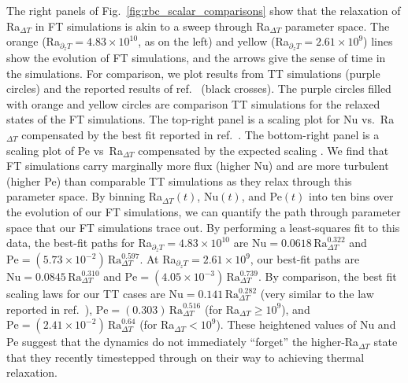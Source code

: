 \documentclass[aps, pre, onecolumn, nofootinbib, notitlepage, groupedaddress, amsfonts, amssymb, amsmath, longbibliography, superscriptaddress]{revtex4-1}
\begin{document}
The right panels of Fig.~\ref{fig:rbc_scalar_comparisons} show that the relaxation of Ra$_{\Delta T}$ in FT simulations is akin to a sweep through Ra$_{\Delta T}$ parameter space.
The orange (Ra$_{\partial_z T} = 4.83 \times 10^{10}$, as on the left) and yellow (Ra$_{\partial_z T} = 2.61 \times 10^{9}$) lines show the evolution of FT simulations, and the arrows give the sense of time in the simulations.
For comparison, we plot results from TT simulations (purple circles) and the reported results of ref.~\cite{zhu&all2018} (black crosses).
The purple circles filled with orange and yellow circles are comparison TT simulations for the relaxed states of the FT simulations.
The top-right panel is a scaling plot for Nu vs.~Ra$_{\Delta T}$ compensated by the best fit reported in ref.~\cite{johnston&doering2009}.
The bottom-right panel is a scaling plot of Pe vs~Ra$_{\Delta T}$ compensated by the expected scaling \cite{ahlers&all2009}.
We find that FT simulations carry marginally more flux (higher Nu) and are more turbulent (higher Pe) than comparable TT simulations as they relax through this parameter space.
By binning Ra$_{\Delta T}(t)$, Nu$(t)$, and Pe$(t)$ into ten bins over the evolution of our FT simulations, we can quantify the path through parameter space that our FT simulations trace out.
By performing a least-squares fit to this data, the best-fit paths for Ra$_{\partial_z T} = 4.83 \times 10^{10}$ are $\text{Nu} = 0.0618\,\text{Ra}_{\Delta T}^{0.322}$ and $\text{Pe} = (5.73 \times 10^{-2})\,\text{Ra}_{\Delta T}^{0.597}$.
At Ra$_{\partial_z T} = 2.61 \times 10^{9}$, our best-fit paths are $\text{Nu} = 0.0845\,\text{Ra}_{\Delta T}^{0.310}$ and $\text{Pe} = (4.05 \times 10^{-3})\,\text{Ra}_{\Delta T}^{0.739}$.
By comparison, the best fit scaling laws for our TT cases are $\text{Nu} = 0.141\,\text{Ra}_{\Delta T}^{0.282}$ (very similar to the law reported in ref.~\cite{johnston&doering2009}), $\text{Pe} = (0.303)\,\text{Ra}_{\Delta T}^{0.516}$ (for Ra$_{\Delta T} \geq 10^9$), and $\text{Pe} = (2.41 \times 10^{-2})\,\text{Ra}_{\Delta T}^{0.64}$ (for Ra$_{\Delta T} < 10^9$).
These heightened values of Nu and Pe suggest that the dynamics do not immediately ``forget'' the higher-Ra$_{\Delta T}$ state that they recently timestepped through on their way to achieving thermal relaxation.
\end{document}
